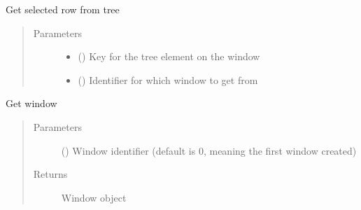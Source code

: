 \documentclass[letterpaper,10pt,english]{sphinxmanual}
\begin{document}
\begin{fulllineitems}
\begin{fulllineitems}
\label{\detokenize{interface:interface.Interface.get_selected_row}}
\sphinxAtStartPar
Get selected row from tree
\begin{quote}\begin{description}
\item[{Parameters}] \leavevmode\begin{itemize}
\item {} 
\sphinxAtStartPar
{} () \textendash{} Key for the tree element on the window

\item {} 
\sphinxAtStartPar
{} (\sphinxstyleliteralemphasis{\sphinxupquote{, }}) \textendash{} Identifier for which window to get from

\end{itemize}

\end{description}\end{quote}

\end{fulllineitems}


\begin{fulllineitems}
\label{\detokenize{interface:interface.Interface.get_window}}
\sphinxAtStartPar
Get window
\begin{quote}\begin{description}
\item[{Parameters}] \leavevmode
\sphinxAtStartPar
{} (\sphinxstyleliteralemphasis{\sphinxupquote{, }}) \textendash{} Window identifier (default is 0, meaning the first window created)

\item[{Returns}] \leavevmode
\sphinxAtStartPar
Window object


\end{description}
\end{quote}
\end{fulllineitems}
\end{fulllineitems}
\end{document}
